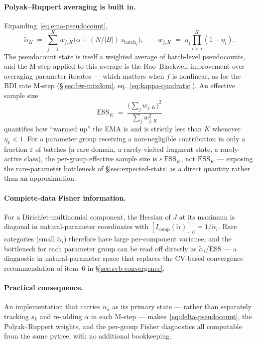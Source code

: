 \paragraph{Polyak--Ruppert averaging is built in.}
Expanding~\eqref{eq:ema-pseudocount},
\[
  \tilde{\alpha}_K \;=\; \sum_{j=1}^K w_{j,K}
    \bigl(\alpha + (N/|B|)\, s_{\text{batch}_j}\bigr),
  \qquad
  w_{j,K} \;=\; \eta_j \prod_{i>j}^K(1-\eta_i).
\]
The pseudocount state is itself a weighted average of batch-level
pseudocounts, and the M-step applied to this average is the
Rao--Blackwell improvement over averaging parameter iterates --- which
matters when $f$ is nonlinear, as for the BDI rate M-step
(\ifdefined\MIXDOMPAPER\S\ref{sec:bw-mixdom}, \fi eq.~\eqref{eq:kappa-quadratic}).  An
effective sample size
\[
  \mathrm{ESS}_K \;=\;
  \frac{\bigl(\sum_j w_{j,K}\bigr)^2}{\sum_j w_{j,K}^2}
\]
quantifies how ``warmed up'' the EMA is and is strictly less than $K$
whenever $\eta_k < 1$.  For a parameter group receiving a
non-negligible contribution in only a fraction $\varepsilon$ of
batches (a rare domain, a rarely-visited fragment state, a
rarely-active class), the per-group effective sample size is
$\varepsilon\,\mathrm{ESS}_K$, not $\mathrm{ESS}_K$ --- exposing the
rare-parameter bottleneck of \S\ref{sec:expected-stats} as a direct
quantity rather than an approximation.

\paragraph{Complete-data Fisher information.}
For a Dirichlet-multinomial component, the Hessian of $J$ at its
maximum is diagonal in natural-parameter coordinates with
$[I_{\text{comp}}(\tilde{\alpha})]_{ii} = 1/\tilde{\alpha}_i$.
Rare categories (small $\tilde{\alpha}_i$) therefore have large
per-component variance, and the bottleneck for each parameter group
can be read off directly as $\tilde{\alpha}_i/\mathrm{ESS}$ ---
a diagnostic in natural-parameter space that replaces the CV-based
convergence recommendation of item~6 in \S\ref{sec:svb-convergence}.

\paragraph{Practical consequence.}
An implementation that carries $\tilde{\alpha}_k$ as its primary state
--- rather than separately tracking $s_k$ and re-adding $\alpha$ in
each M-step --- makes~\eqref{eq:delta-pseudocount}, the
Polyak--Ruppert weights, and the per-group Fisher diagnostics all
computable from the same pytree, with no additional bookkeeping.

